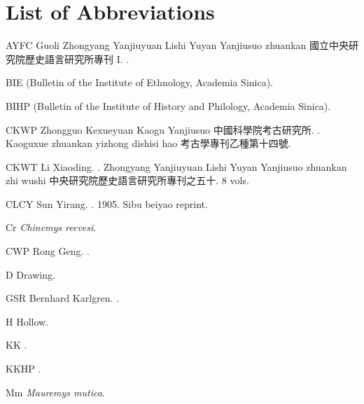 
\section*{List of Abbreviations}

\newlength{\keightleyfrontabbrlabelwidth}
\begin{list}{}{%
  \setlength{\labelwidth}{\keightleyfrontabbrlabelwidth}%
  \setlength{\labelsep}{1em}%
  \setlength{\leftmargin}{\labelwidth}%
  \addtolength{\leftmargin}{\labelsep}%
  \setlength{\itemindent}{0pt}%
  \setlength{\itemsep}{0.5\baselineskip}%
  \setlength{\parsep}{0pt}%
  \setlength{\topsep}{0.5\baselineskip}%
  \renewcommand{\makelabel}[1]{\textbf{#1}\hfill}%
}
  \item[AYFC] Guoli Zhongyang Yanjiuyuan Lishi Yuyan Yanjiusuo zhuankan 國立中央研究院歷史語言研究所專刊 I. .
  \item[BIE]  (Bulletin of the Institute of Ethnology, Academia Sinica).
  \item[BIHP]  (Bulletin of the Institute of History and Philology, Academia Sinica).
  \item[CKWP] Zhongguo Kexueyuan Kaogu Yanjiusuo 中國科學院考古研究所. . Kaoguxue zhuankan yizhong dishisi hao 考古學專刊乙種第十四號.
  \item[CKWT] Li Xiaoding. . Zhongyang Yanjiuyuan Lishi Yuyan Yanjiusuo zhuankan zhi wushi 中央研究院歷史語言研究所專刊之五十. 8 vols.
  \item[CLCY] Sun Yirang. . 1905. Sibu beiyao reprint.
  \item[Cr] \textit{Chinemys reevesi}.
  \item[CWP] Rong Geng. .
  \item[D] Drawing.
  \item[GSR] Bernhard Karlgren. .
  \item[H] Hollow.
  \item[KK] .
  \item[KKHP] .
  \item[Mm] \textit{Mauremys mutica}.

\end{list}
